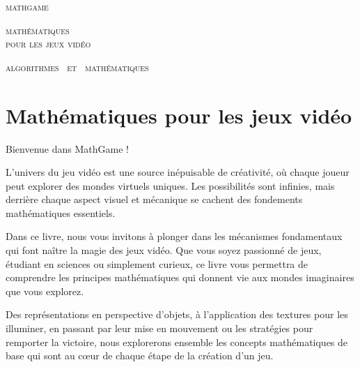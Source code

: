 
\pagestyle{empty}\thispagestyle{empty}
\vspace*{\fill}
\vspace*{5ex}
\begin{center}
	\fontsize{40}{40}\selectfont
	\textsc{mathgame}
	
	\vspace*{1ex}
	\textsc{\fontsize{24}{24}\selectfont 
	mathématiques  \\[-1.5ex]
	pour les jeux vidéo
	}
	
	\vspace*{2ex}
	
	\Large

\end{center}
\vfill
\begin{center}
	\Large
	\textsc{algorithmes \  et \  mathématiques}
\end{center}
\begin{center}
\end{center}

\clearemptydoublepage

\thispagestyle{empty}


\vspace*{\fill}
\section*{Mathématiques pour les jeux vidéo}



Bienvenue dans \og{}MathGame\fg{} !

\medskip

L'univers du jeu vidéo est une source inépuisable de créativité, où chaque joueur peut explorer des mondes virtuels uniques. Les possibilités sont infinies, mais derrière chaque aspect visuel et mécanique se cachent des fondements mathématiques essentiels.

\medskip

Dans ce livre, nous vous invitons à plonger dans les mécanismes fondamentaux qui font naître la magie des jeux vidéo. Que vous soyez passionné de jeux, étudiant en sciences ou simplement curieux, ce livre vous permettra de comprendre les principes mathématiques qui donnent vie aux mondes imaginaires que vous explorez.

\medskip

Des représentations en perspective d'objets, à l'application des textures pour les illuminer, en passant par leur mise en mouvement ou les stratégies pour remporter la victoire, nous explorerons ensemble les concepts mathématiques de base qui sont au cœur de chaque étape de la création d'un jeu.

